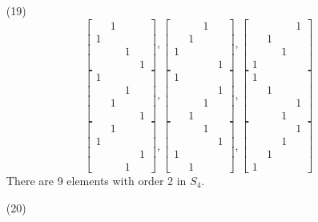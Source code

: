 \begin{itemize}
\begin{itemize}
\end{itemize}
\item[(19)]
$$\begin{bmatrix}
& 1 \\
1 & \\
& & 1 \\
& & & 1
\end{bmatrix}, \begin{bmatrix}
& & 1 \\
& 1 \\
1 \\
& & & 1
\end{bmatrix}, \begin{bmatrix}
& & & 1 \\
& 1 \\
& & 1 \\
1
\end{bmatrix}$$
$$\begin{bmatrix}
1 \\
& & 1 \\
& 1 \\
& & & 1
\end{bmatrix}, \begin{bmatrix}
1 \\
& & & 1 \\
& & 1 \\
& 1
\end{bmatrix}, \begin{bmatrix}
1 \\
& 1 \\
& & & 1 \\
& & 1
\end{bmatrix}$$
$$\begin{bmatrix}
& 1 \\
1 \\
& & & 1 \\
& & 1
\end{bmatrix}, \begin{bmatrix}
& & 1 \\
& & & 1 \\
1 \\
& 1
\end{bmatrix}, \begin{bmatrix}
& & & 1 \\
& & 1 \\
& 1 \\
1
\end{bmatrix}$$
There are 9 elements with order 2 in $S_4$.
\item[(20)]
\begin{itemize}

\end{itemize}
\end{itemize}
